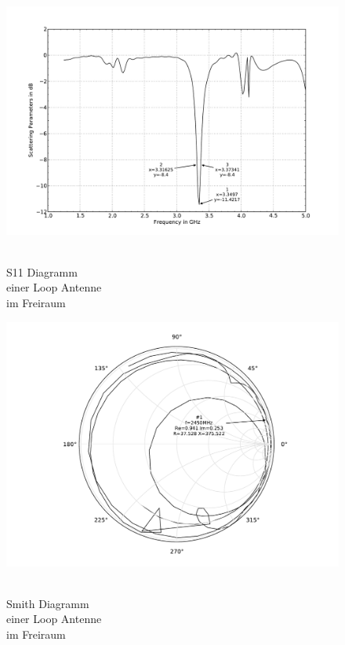 \begin{figure}[!h]
\begin{center}
  \includegraphics[width=\linewidth]{content/bilder/Evaluation/Loop/ohneABS/S11_Loop_Coil_ohneABS.pdf}
  \caption{\\S11 Diagramm \\einer Loop Antenne \\ im Freiraum}\label{fig:S11_Loop_freiraum_1}
\endminipage%
{}
  \includegraphics[width=\linewidth]{content/bilder/Evaluation/Loop/ohneABS/Smith_Loop_Coil_ohneABS.pdf}
  \caption{\\Smith Diagramm \\einer Loop Antenne \\ im Freiraum}\label{fig:Smith_Loop_freiraum_2}
\endminipage
\end{center}
\end{figure}

